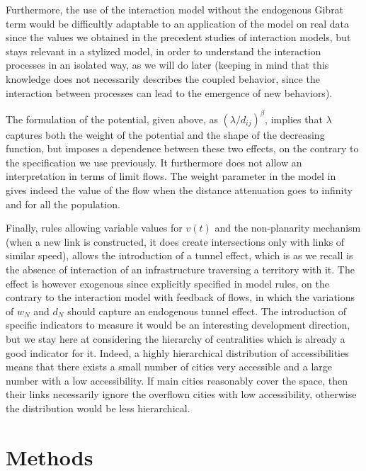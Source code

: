 Furthermore, the use of the interaction model without the endogenous Gibrat term would be difficultly adaptable to an application of the model on real data since the values we obtained in the precedent studies of interaction models, but stays relevant in a stylized model, in order to understand the interaction processes in an isolated way, as we will do later (keeping in mind that this knowledge does not necessarily describes the coupled behavior, since the interaction between processes can lead to the emergence of new behaviors).

The formulation of the potential, given above, as $(\lambda / d_{ij})^\beta$, implies that $\lambda$ captures both the weight of the potential and the shape of the decreasing function, but imposes a dependence between these two effects, on the contrary to the specification we use previously. It furthermore does not allow an interpretation in terms of limit flows. The weight parameter in the model in~\cite{raimbault2018indirect} gives indeed the value of the flow when the distance attenuation goes to infinity and for all the population.

Finally, rules allowing variable values for $v(t)$ and the non-planarity mechanism (when a new link is constructed, it does create intersections only with links of similar speed), allows the introduction of a tunnel effect, which is as we recall is the absence of interaction of an infrastructure traversing a territory with it. The effect is however exogenous since explicitly specified in model rules, on the contrary to the interaction model with feedback of flows, in which the variations of $w_N$ and $d_N$ should capture an endogenous tunnel effect. The introduction of specific indicators to measure it would be an interesting development direction, but we stay here at considering the hierarchy of centralities which is already a good indicator for it. Indeed, a highly hierarchical distribution of accessibilities means that there exists a small number of cities very accessible and a large number with a low accessibility. If main cities reasonably cover the space, then their links necessarily ignore the overflown cities with low accessibility, otherwise the distribution would be less hierarchical.



\section{Methods}

